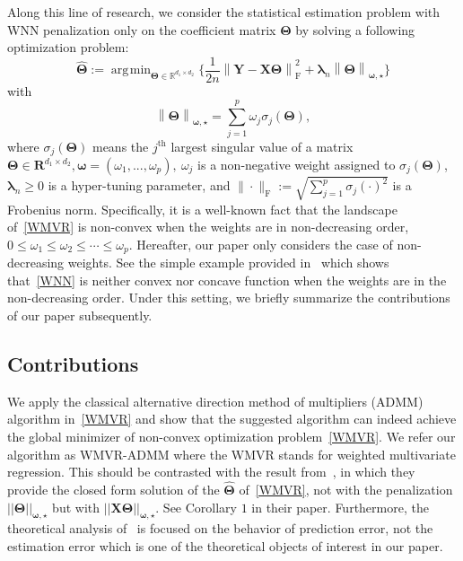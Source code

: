 \documentclass[alpha-refs]{wiley-article}
\DeclareMathOperator*{\argmin}{\arg\!\min}
\begin{document}
Along this line of research, we consider the statistical estimation problem with WNN penalization only on the coefficient matrix $\boldsymbol{\Theta}$ by solving a following optimization problem:
\begin{equation}  \label{WMVR}
    \widehat{\boldsymbol{\Theta}} := \argmin_{\boldsymbol{\Theta}\in\mathbb{R}^{d_{1}\times d_{2}}} \bigg\{ \frac{1}{2n} \left\| \boldsymbol{Y}-\boldsymbol{X}\boldsymbol{\Theta} \right\|_{\text{F}}^{2} + \boldsymbol{\lambda}_{n} \left\| \boldsymbol{\Theta}\right\|_{\boldsymbol{\omega,\star}} \bigg\}
\end{equation}
with
\begin{equation} \label{WNN}
     \left\| \boldsymbol{\Theta} \right\|_{\boldsymbol{\omega,\star}} =\sum^{p}_{j=1} \omega_{j}\sigma_{j}(\boldsymbol{\Theta}),
\end{equation}
where $\sigma_{j}(\boldsymbol{\Theta})$ means the $j^{\text{th}}$ largest singular value of a matrix $\boldsymbol{\Theta} \in \boldsymbol{R}^{d_{1} \times d_{2}}, \boldsymbol{\omega} = (\omega_{1}, ..., \omega_{p}),\ \omega_{j}$ is a non-negative weight assigned to $\sigma_{j}(\boldsymbol{\Theta})$, $\boldsymbol{\lambda}_{n}\geq 0$ is a hyper-tuning parameter, and $\| \cdot \|_{\text{F}}:=\sqrt{\sum_{j=1}^{p}\sigma_{j}(\cdot)^{2}}$ is a Frobenius norm.
Specifically, it is a well-known fact that the landscape of~\eqref{WMVR} is non-convex when the weights are in non-decreasing order, $0\leq\omega_{1}\leq\omega_{2}\leq\cdots\leq\omega_{p}$.
Hereafter, our paper only considers the case of non-decreasing weights.
See the simple example provided in~\citet{chen2013reduced} which shows that~\eqref{WNN} is neither convex nor concave function when the weights are in the non-decreasing order.
Under this setting, we briefly summarize the contributions of our paper subsequently.

\subsection{Contributions}
We apply the classical alternative direction method of multipliers (ADMM) algorithm in~\eqref{WMVR} and show that the suggested algorithm can indeed achieve the global minimizer of non-convex optimization problem~\eqref{WMVR}.
We refer our algorithm as WMVR-ADMM where the WMVR stands for weighted multivariate regression.
This should be contrasted with the result from~\citet{chen2013reduced}, in which they provide the closed form solution of the
$\widehat{\boldsymbol{\Theta}}$ of~\eqref{WMVR}, not with the penalization $||\boldsymbol{\Theta}||_{\boldsymbol{\omega,\star}}$ but
with $||\boldsymbol{X\Theta}||_{\boldsymbol{\omega,\star}}$.
See Corollary $1$ in their paper.
Furthermore, the theoretical analysis of~\citet{chen2013reduced} is focused on the behavior of prediction error, not the estimation error which is one of the theoretical objects of interest in our paper.
\end{document}
